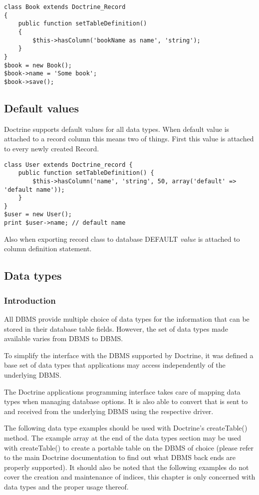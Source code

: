 \documentclass[11pt,a4paper]{report}
\begin{document}
\begin{verbatim}
class Book extends Doctrine_Record
{
    public function setTableDefinition()
    {
        $this->hasColumn('bookName as name', 'string');
    }
}
$book = new Book();
$book->name = 'Some book';
$book->save();
\end{verbatim}

\subsection{Default values}
Doctrine supports default values for all data types. When default value is attached to a record column this means two of things.\newline
First this value is attached to every newly created Record.

\begin{verbatim}
class User extends Doctrine_record {
    public function setTableDefinition() {
        $this->hasColumn('name', 'string', 50, array('default' => 'default name'));
    }
}
$user = new User();
print $user->name; // default name
\end{verbatim}

Also when exporting record class to database DEFAULT \textsl{value} is attached to column definition statement.

\subsection{Data types}
\subsubsection{Introduction}
All DBMS provide multiple choice of data types for the information that can be stored in their database table fields. However, the set of data types made available varies from DBMS to DBMS.

To simplify the interface with the DBMS supported by Doctrine, it was defined a base set of data types that applications may access independently of the underlying DBMS.

The Doctrine applications programming interface takes care of mapping data types when managing database options. It is also able to convert that is sent to and received from the underlying DBMS using the respective driver.

The following data type examples should be used with Doctrine's createTable() method. The example array at the end of the data types section may be used with createTable() to create a portable table on the DBMS of choice (please refer to the main Doctrine documentation to find out what DBMS back ends are properly supported). It should also be noted that the following examples do not cover the creation and maintenance of indices, this chapter is only concerned with data types and the proper usage thereof.
\end{document}
